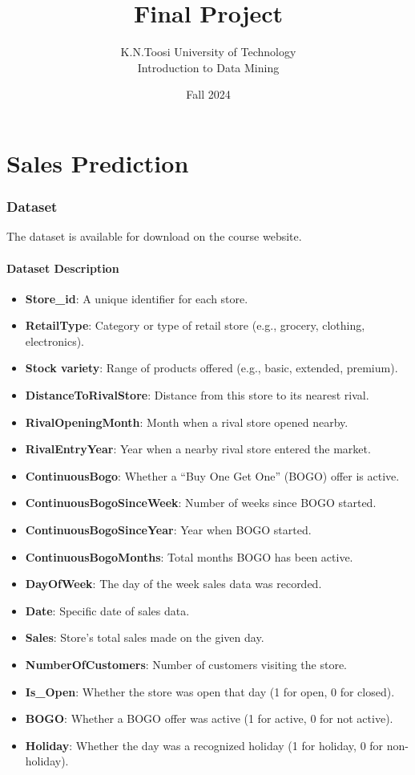\documentclass{article}
\begin{document}
	
	\title{Final Project}
	\author{K.N.Toosi University of Technology\\Introduction to Data Mining}
	\date{Fall 2024}
	\maketitle
	\newpage

	\part{Sales Prediction}
	\section*{Dataset}
	The dataset is available for download on the course website.
	\subsection*{Dataset Description}
	\begin{itemize}
		\item \textbf{Store\_id}: A unique identifier for each store.
		\item \textbf{RetailType}: Category or type of retail store (e.g., grocery, clothing, electronics).
		\item \textbf{Stock variety}: Range of products offered (e.g., basic, extended, premium).
		\item \textbf{DistanceToRivalStore}: Distance from this store to its nearest rival.
		\item \textbf{RivalOpeningMonth}: Month when a rival store opened nearby.
		\item \textbf{RivalEntryYear}: Year when a nearby rival store entered the market.
		\item \textbf{ContinuousBogo}: Whether a “Buy One Get One” (BOGO) offer is active.
		\item \textbf{ContinuousBogoSinceWeek}: Number of weeks since BOGO started.
		\item \textbf{ContinuousBogoSinceYear}: Year when BOGO started.
		\item \textbf{ContinuousBogoMonths}: Total months BOGO has been active.
		\item \textbf{DayOfWeek}: The day of the week sales data was recorded.
		\item \textbf{Date}: Specific date of sales data.
		\item \textbf{Sales}: Store's total sales made on the given day.
		\item \textbf{NumberOfCustomers}: Number of customers visiting the store.
		\item \textbf{Is\_Open}: Whether the store was open that day (1 for open, 0 for closed).
		\item \textbf{BOGO}: Whether a BOGO offer was active (1 for active, 0 for not active).
		\item \textbf{Holiday}: Whether the day was a recognized holiday (1 for holiday, 0 for non-holiday).
	\end{itemize}
	
\end{document}
